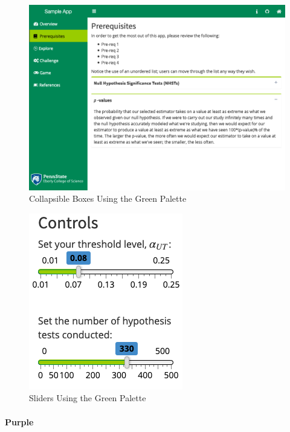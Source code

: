 \documentclass[
]{book}
\begin{document}
\begin{figure}

{\centering \includegraphics[width=14in]{images/greenCollapse} 

}

\caption{Collapsible Boxes Using the Green Palette}\label{fig:greenAction2}
\end{figure}

\begin{figure}

{\centering \includegraphics{images/greenSliders} 

}

\caption{Sliders Using the Green Palette}\label{fig:greenAction3}
\end{figure}

\hypertarget{purple}{%
\paragraph{Purple}\label{purple}}
\end{document}

